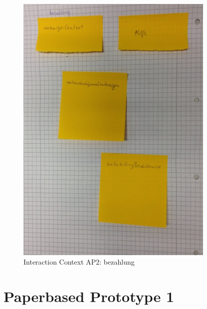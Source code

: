 \begin{figure}[H]
\centering
\includegraphics[angle=90, width=0.85\textwidth] {./images/abstract/version2/bezahlung.JPG}
\caption{Interaction Context AP2: bezahlung}
\label{interfaceContents52}
\end{figure}

\newpage
{}
\section*{Paperbased Prototype 1}

